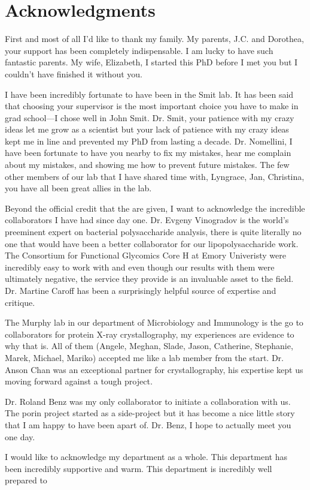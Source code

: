 
\chapter{Acknowledgments}

First and most of all I'd like to thank my family. My parents, J.C. and Dorothea, your support has been completely indispensable. I am lucky to have such fantastic parents. My wife, Elizabeth, I started this PhD before I met you but I couldn't have finished it without you. 

I have been incredibly fortunate to have been in the Smit lab. It has been said that choosing your supervisor is the most important choice you have to make in grad school---I chose well in John Smit. Dr. Smit, your patience with my crazy ideas let me grow as a scientist but your lack of patience with my crazy ideas kept me in line and prevented my PhD from lasting a decade. Dr. Nomellini, I have been fortunate to have you nearby to fix my mistakes, hear me complain about my mistakes, and showing me how to prevent future mistakes. The few other members of our lab that I have shared time with, Lyngrace, Jan, Christina, you have all been great allies in the lab.

Beyond the official credit that the are given, I want to acknowledge the incredible collaborators I have had since day one. 
Dr. Evgeny Vinogradov is the world's preeminent expert on bacterial polysaccharide analysis, there is quite literally no one that would have been a better collaborator for our lipopolysaccharide work. The Consortium for Functional Glycomics Core H at Emory Univeristy were incredibly easy to work with and even though our results with them were ultimately negative, the service they provide is an invaluable asset to the field. Dr. Martine Caroff has been a surprisingly helpful source of expertise and critique. 

The Murphy lab in our department of Microbiology and Immunology is the go to collaborators for protein X-ray crystallography, my experiences are evidence to why that is. All of them (Angele, Meghan, Slade, Jason, Catherine, Stephanie, Marek, Michael, Mariko) accepted me like a lab member from the start. Dr. Anson Chan was an exceptional partner for crystallography, his expertise kept us moving forward against a tough project.

Dr. Roland Benz was my only collaborator to initiate a collaboration with us. The porin project started as a side-project but it has become a nice little story that I am happy to have been apart of. Dr. Benz, I hope to actually meet you one day.

I would like to acknowledge my department as a whole. This department has been incredibly supportive and warm. This department is incredibly well prepared to 
